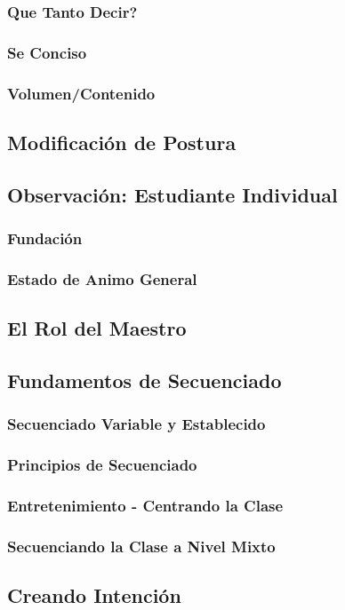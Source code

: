 \documentclass[a4paper]{book}
\begin{document}
\subsubsection{Que Tanto Decir?}
\subsubsection{Se Conciso}
\subsubsection{Volumen/Contenido}
\subsection{Modificación de Postura}
\subsection{Observación: Estudiante Individual}
\subsubsection{Fundación}
\subsubsection{Estado de Animo General}
\subsection{El Rol del Maestro}
\subsection{Fundamentos de Secuenciado}
\subsubsection{Secuenciado Variable y Establecido}
\subsubsection{Principios de Secuenciado}
\subsubsection{Entretenimiento - Centrando la Clase}
\subsubsection{Secuenciando la Clase a Nivel Mixto}
\subsection{Creando Intención}
\end{document}
